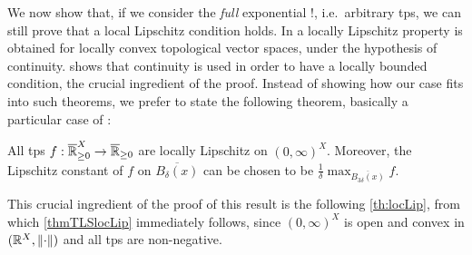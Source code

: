 We now show that, if we consider the \emph{full} exponential $!$, i.e.~arbitrary tps, we can still prove that a local Lipschitz condition holds. %
In \cite[Theorem 6.4]{Cobzas2017} a locally Lipschitz property is obtained for locally convex topological vector spaces, under the hypothesis of continuity. \cite[Proposition 6.5]{Cobzas2017} shows that continuity is used in order to have a locally bounded condition, the crucial ingredient of the proof.
Instead of showing how our case fits into such theorems, we prefer to state the following theorem, basically a particular case of \cite[Theorem 6.9, Lemma 6.10]{Cobzas2017}:

\begin{theorem}\label{thmTLSlocLip}
All tps $f:\overline{\mathbb{R}}_{\geq 0}^X\to\overline{\mathbb{R}}_{\geq 0}$ are locally Lipschitz on $(0,\infty)^X$.
Moreover, the Lipschitz constant of $f$ on $\overline{B_{\delta}(x)}$ can be chosen to be $\frac{1}{\delta}\max_{\overline{B_{3\delta}(x)}} f$.
\end{theorem}
This crucial ingredient of the proof of this result is the following \autoref{th:locLip}, from which \autoref{thmTLSlocLip} immediately follows, since $(0,\infty)^X$ is open and convex in $(\mathbb{R}^X,\lVert\cdot\rVert)$ and all tps are non-negative.

